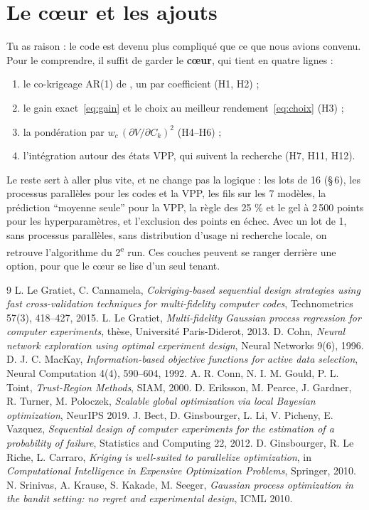 \documentclass[11pt,a4paper]{article}
\begin{document}
\section{Le cœur et les ajouts}
Tu as raison : le code est devenu plus compliqué que ce que nous avions convenu. Pour le comprendre, il suffit
de garder le \textbf{cœur}, qui tient en quatre lignes :
\begin{enumerate}
  \item le co-krigeage AR(1) de \cite{LG}, un par coefficient (H1, H2) ;
  \item le gain exact~\eqref{eq:gain} et le choix au meilleur rendement~\eqref{eq:choix} (H3) ;
  \item la pondération par $w_c\,(\partial V/\partial C_k)^2$ (H4–H6) ;
  \item l'intégration autour des états VPP, qui suivent la recherche (H7, H11, H12).
\end{enumerate}
Le reste sert à aller plus vite, et ne change pas la logique : les lots de 16 (§\,6), les processus
parallèles pour les codes et la VPP, les fils sur les 7 modèles, la prédiction \enquote{moyenne seule} pour la
VPP, la règle des 25 \% et le gel à 2\,500 points pour les hyperparamètres, et l'exclusion des points en
échec. Avec un lot de 1, sans processus parallèles, sans distribution d'usage ni recherche locale, on
retrouve l'algorithme du 2\textsuperscript{e} run. Ces couches peuvent se ranger derrière une option, pour
que le cœur se lise d'un seul tenant.

\begin{thebibliography}{9}\footnotesize\setlength{\itemsep}{0pt}
 L. Le Gratiet, C. Cannamela, \emph{Cokriging-based sequential design strategies using fast
cross-validation techniques for multi-fidelity computer codes}, Technometrics 57(3), 418–427, 2015.
 L. Le Gratiet, \emph{Multi-fidelity Gaussian process regression for computer experiments},
thèse, Université Paris-Diderot, 2013.
 D. Cohn, \emph{Neural network exploration using optimal experiment design}, Neural
Networks 9(6), 1996.
 D. J. C. MacKay, \emph{Information-based objective functions for active data
selection}, Neural Computation 4(4), 590–604, 1992.
 A. R. Conn, N. I. M. Gould, P. L. Toint, \emph{Trust-Region Methods}, SIAM, 2000.
 D. Eriksson, M. Pearce, J. Gardner, R. Turner, M. Poloczek, \emph{Scalable global
optimization via local Bayesian optimization}, NeurIPS 2019.
 J. Bect, D. Ginsbourger, L. Li, V. Picheny, E. Vazquez, \emph{Sequential design of computer
experiments for the estimation of a probability of failure}, Statistics and Computing 22, 2012.
 D. Ginsbourger, R. Le Riche, L. Carraro, \emph{Kriging is well-suited to parallelize
optimization}, in \emph{Computational Intelligence in Expensive Optimization Problems}, Springer, 2010.
 N. Srinivas, A. Krause, S. Kakade, M. Seeger, \emph{Gaussian process optimization in
the bandit setting: no regret and experimental design}, ICML 2010.
\end{thebibliography}
\end{document}
